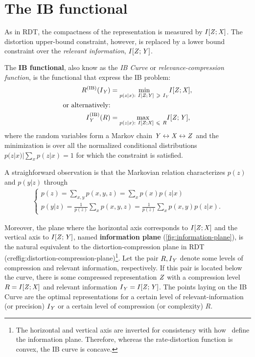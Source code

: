\section{The IB functional}\label{sec:ib_functional}
As in {RDT}, the compactness of the representation is measured by $I[{\mathit{Z}};{\mathit{X}}]$.  The distortion upper-bound constraint, however, is replaced by a lower bound constraint over the \emph{relevant information}, $I[{\mathit{Z}};{\mathit{Y}}]$\cite{slonim:2002}.

\begin{definition} The \textbf{IB functional}, also know as the \emph{IB Curve} or \emph{relevance-compression function}, is the functional that express the IB problem\cite{bachrach:2003}:
\begin{align}
	R^{(\text{IB})}(I_{{\mathit{Y}}}) &= \underset{p(z|x):~ I[{\mathit{Z}};{\mathit{Y}}]{~\geqslant ~} I_{{\mathit{Y}}}}{\min} I[{\mathit{Z}};{\mathit{X}}],\\
	\text{or alternatively:} \nonumber                                              \\
	I_{{\mathit{Y}}}^{(\text{IB})}(R)&= \underset{p(z|x):~ I[{\mathit{Z}};{\mathit{X}}]{~\leqslant ~} R}{\max} I[{\mathit{Z}};{\mathit{Y}}],
\end{align}
where the random variables form a Markov chain ${\mathit{Y}} \leftrightarrow  {\mathit{X}} \leftrightarrow  {\mathit{Z}}$ and the minimization is over all the normalized conditional distributions $p(z|x)|\sum_x p(z|x)=1$ for which the constraint is satisfied.
\end{definition}
A straighforward observation is that the Markovian relation characterizes $p(z)$ and $p(y|z)$ through\cite{slonim:2002}
\begin{align}
	\begin{cases}
		p(z) = \sum_{x,y} p(x,y,z) = \sum_x p(x)p(z|x)  \\
		p(y|z) = \frac{1}{p(z)}\sum_x p(x,y,z) = \frac{1}{p(z)}\sum_x p(x,y) p(z|x).\label{observation}
	\end{cases}
\end{align}

Moreover, the plane where the horizontal axis corresponds to $I[{\mathit{Z}};{\mathit{X}}]$ and the vertical axis to $I[{\mathit{Z}};{\mathit{Y}}]$, named \textbf{information plane} (\cref{fig:information-plane}), is the natural equivalent to the distortion-compression plane in \acl{RDT} (cref{fig:distortion-compression-plane})\footnote{The horizontal and vertical axis are inverted for consistency with how~ define the information plane. Therefore, whereas the rate-distortion function is convex, the IB curve is concave.}. Let the pair ${R, I_{{\mathit{Y}}}}$ denote some levels of compression and relevant information, respectively. If this pair is located below the curve, there is some compressed representation ${\mathit{Z}}$ with a compression level $R=I[{\mathit{Z}};{\mathit{X}}]$ and relevant information $I_{{\mathit{Y}}}=I[{\mathit{Z}};{\mathit{Y}}]$. The points laying on the IB Curve are the optimal representations for a certain level of relevant-information (or precision) $I_{{\mathit{Y}}}$ or a certain level of compression (or complexity) $R$.

